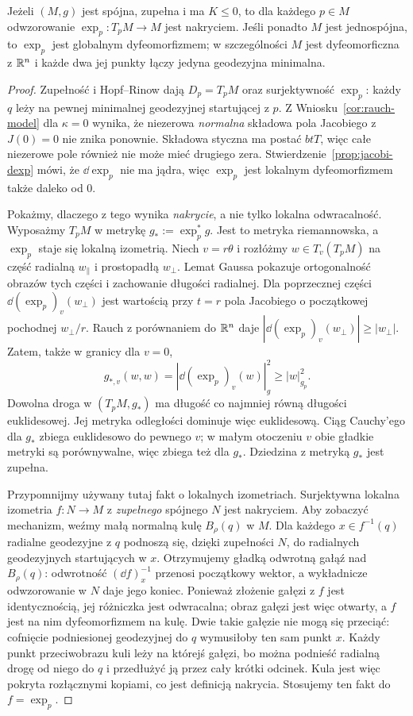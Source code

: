 \begin{twierdzenie}
\label{thm:cartan-hadamard}
Jeżeli $(M,g)$ jest spójna, zupełna i ma
$K\leq0$, to dla każdego $p\in M$
odwzorowanie
$\exp_p:T_pM\to M$ jest nakryciem.
Jeśli ponadto $M$ jest jednospójna, to
$\exp_p$ jest globalnym dyfeomorfizmem;
w szczególności $M$ jest dyfeomorficzna
z $\mathbb{R}^n$ i każde dwa jej punkty łączy
jedyna geodezyjna minimalna.
\end{twierdzenie}
\begin{proof}
Zupełność i Hopf--Rinow dają
$D_p=T_pM$ oraz surjektywność $\exp_p$:
każdy $q$ leży na pewnej minimalnej
geodezyjnej startującej z $p$.
Z Wniosku~\ref{cor:rauch-model} dla $\kappa=0$
wynika, że niezerowa \emph{normalna} składowa
pola Jacobiego z $J(0)=0$ nie znika ponownie.
Składowa styczna ma postać $btT$, więc całe
niezerowe pole również nie może mieć drugiego zera.
Stwierdzenie~\ref{prop:jacobi-dexp} mówi,
że $\dd\exp_p$ nie ma jądra, więc $\exp_p$
jest lokalnym dyfeomorfizmem także daleko od $0$.

Pokażmy, dlaczego z tego wynika \emph{nakrycie},
a nie tylko lokalna odwracalność.
Wyposażmy $T_pM$ w metrykę $g_*:=\exp_p^*g$.
Jest to metryka riemannowska, a $\exp_p$
staje się lokalną izometrią. Niech $v=r\theta$
i rozłóżmy $w\in T_v(T_pM)$ na część radialną
$w_\parallel$ i prostopadłą $w_\perp$.
Lemat Gaussa pokazuje ortogonalność obrazów
tych części i zachowanie długości radialnej.
Dla poprzecznej części
$\dd(\exp_p)_v(w_\perp)$ jest wartością
przy $t=r$ pola Jacobiego o początkowej
pochodnej $w_\perp/r$. Rauch z porównaniem
do $\mathbb{R}^n$ daje
$|\dd(\exp_p)_v(w_\perp)|\geq|w_\perp|$.
Zatem, także w granicy dla $v=0$,
\begin{equation}\label{eq:hadamard-exp-rozszerza}
 g_{*,v}(w,w)=|\dd(\exp_p)_v(w)|_g^2
 \geq |w|_{g_p}^2.
\end{equation}
Dowolna droga w $(T_pM,g_*)$ ma długość
co najmniej równą długości euklidesowej.
Jej metryka odległości dominuje więc
euklidesową. Ciąg Cauchy'ego dla $g_*$
zbiega euklidesowo do pewnego $v$;
w małym otoczeniu $v$ obie gładkie metryki
są porównywalne, więc zbiega też dla $g_*$.
Dziedzina z metryką $g_*$ jest zupełna.

Przypomnijmy używany tutaj fakt o lokalnych
izometriach. Surjektywna lokalna izometria
$f:N\to M$ z \emph{zupełnego} spójnego $N$
jest nakryciem. Aby zobaczyć mechanizm,
weźmy małą normalną kulę $B_\rho(q)$ w $M$.
Dla każdego $x\in f^{-1}(q)$ radialne geodezyjne
z $q$ podnoszą się, dzięki zupełności $N$,
do radialnych geodezyjnych startujących w $x$.
Otrzymujemy gładką odwrotną gałąź nad
$B_\rho(q)$: odwrotność $(\dd f)_x^{-1}$ przenosi
początkowy wektor, a wykładnicze odwzorowanie
w $N$ daje jego koniec. Ponieważ złożenie gałęzi z $f$
jest identycznością, jej różniczka jest odwracalna;
obraz gałęzi jest więc otwarty, a $f$ jest na nim
dyfeomorfizmem na kulę. Dwie takie gałęzie
nie mogą się przeciąć: cofnięcie podniesionej
geodezyjnej do $q$ wymusiłoby ten sam punkt $x$.
Każdy punkt przeciwobrazu kuli leży na którejś
gałęzi, bo można podnieść radialną drogę
od niego do $q$ i przedłużyć ją przez cały
krótki odcinek. Kula jest więc pokryta
rozłącznymi kopiami, co jest definicją nakrycia.
Stosujemy ten fakt do $f=\exp_p$.


\end{proof}
